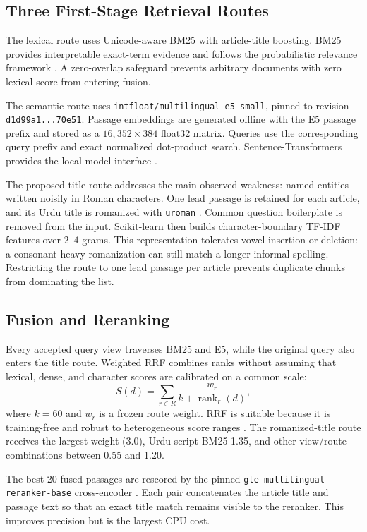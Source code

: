 \documentclass[conference]{IEEEtran}
\begin{document}
\subsection{Three First-Stage Retrieval Routes}
The lexical route uses Unicode-aware BM25 with article-title boosting. BM25 provides interpretable exact-term evidence and follows the probabilistic relevance framework \cite{robertson2009bm25}. A zero-overlap safeguard prevents arbitrary documents with zero lexical score from entering fusion.

The semantic route uses \texttt{intfloat/multilingual-e5-small}, pinned to revision \texttt{d1d99a1...70e51}. Passage embeddings are generated offline with the E5 passage prefix and stored as a $16{,}352 \times 384$ float32 matrix. Queries use the corresponding query prefix and exact normalized dot-product search. Sentence-Transformers provides the local model interface \cite{reimers2019sentencebert}.

The proposed title route addresses the main observed weakness: named entities written noisily in Roman characters. One lead passage is retained for each article, and its Urdu title is romanized with \texttt{uroman} \cite{uroman}. Common question boilerplate is removed from the input. Scikit-learn \cite{pedregosa2011scikit} then builds character-boundary TF-IDF features over $2$--$4$-grams. This representation tolerates vowel insertion or deletion: a consonant-heavy romanization can still match a longer informal spelling. Restricting the route to one lead passage per article prevents duplicate chunks from dominating the list.

\subsection{Fusion and Reranking}
Every accepted query view traverses BM25 and E5, while the original query also enters the title route. Weighted RRF combines ranks without assuming that lexical, dense, and character scores are calibrated on a common scale:
\begin{equation}
S(d)=\sum_{r \in R}\frac{w_r}{k+\operatorname{rank}_r(d)},
\end{equation}
where $k=60$ and $w_r$ is a frozen route weight. RRF is suitable because it is training-free and robust to heterogeneous score ranges \cite{cormack2009rrf}. The romanized-title route receives the largest weight (3.0), Urdu-script BM25 1.35, and other view/route combinations between 0.55 and 1.20.

The best 20 fused passages are rescored by the pinned \texttt{gte-multilingual-reranker-base} cross-encoder \cite{gteReranker}. Each pair concatenates the article title and passage text so that an exact title match remains visible to the reranker. This improves precision but is the largest CPU cost.
\end{document}
